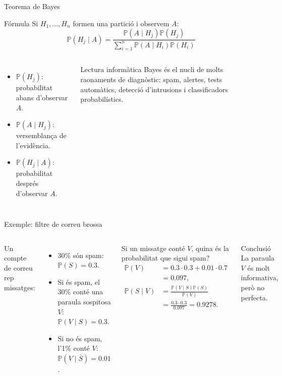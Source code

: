 \documentclass[10pt,aspectratio=169]{beamer}
\newcommand{\Prob}{\mathbb{P}}
\begin{document}
\begin{frame}{Teorema de Bayes}
\begin{block}{Fórmula}
Si $H_1,\ldots,H_n$ formen una partició i observem $A$:
\[
\boxed{
\Prob(H_j\mid A)=
\frac{\Prob(A\mid H_j)\Prob(H_j)}
{\sum_{i=1}^n \Prob(A\mid H_i)\Prob(H_i)}
}
\]
\end{block}
\vspace{0.2cm}
\begin{columns}[T]
\begin{itemize}
  \item $\Prob(H_j)$: probabilitat abans d'observar $A$.
  \item $\Prob(A\mid H_j)$: versemblança de l'evidència.
  \item $\Prob(H_j\mid A)$: probabilitat després d'observar $A$.
\end{itemize}
\begin{alertblock}{Lectura informàtica}
Bayes és el nucli de molts raonaments de diagnòstic: spam, alertes, tests automàtics, detecció d'intrusions i classificadors probabilístics.
\end{alertblock}
\end{columns}
\end{frame}

\begin{frame}{Exemple: filtre de correu brossa}
\begin{columns}[T]
Un compte de correu rep missatges:
\begin{itemize}
  \item $30\%$ són spam: $\Prob(S)=0.3$.
  \item Si és spam, el $30\%$ conté una paraula sospitosa $V$: $\Prob(V\mid S)=0.3$.
  \item Si no és spam, l'1\% conté $V$: $\Prob(V\mid \overline{S})=0.01$.
\end{itemize}
Si un missatge conté $V$, quina és la probabilitat que sigui spam?
\begin{align*}
\Prob(V) &= 0.3\cdot 0.3 + 0.01\cdot 0.7 \\
&=0.097,\\[0.2cm]
\Prob(S\mid V) &= \frac{\Prob(V\mid S)\Prob(S)}{\Prob(V)}\\
&=\frac{0.3\cdot 0.3}{0.097}=0.9278.
\end{align*}
\begin{block}{Conclusió}
La paraula $V$ és molt informativa, però no perfecta.
\end{block}
\end{columns}
\end{frame}
\end{document}
